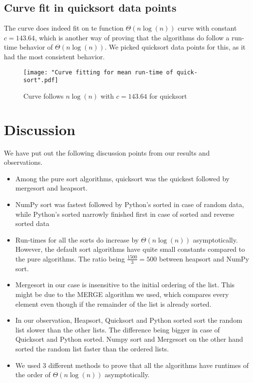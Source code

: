 \documentclass[sigconf, nonacm, natbib, screen, balance=False]{acmart}
\begin{document}
\subsection{Curve fit in quicksort data points}\label{sec:curveresult}
The curve does indeed fit on te function $\Theta \left(n\log\left(n\right)\right)$ curve with constant $c=143.64$, which is another way of proving that the algorithms do follow a run-time behavior of $\Theta \left(n\log\left(n\right)\right)$. We picked quicksort data points for this, as it had the most consistent behavior.

\begin{figure}[ht]
\texttt{[image: "Curve fitting for mean run-time of quick-sort".pdf]}
    \caption{Curve follows $n \log\left(n\right)$ with $c= 143.64$ for quicksort}
    \label{fig:curvefit}
\end{figure}

\section{Discussion}\label{sec:discussion}
We have put out the following discussion points from our results and observations.

\begin{itemize}
\item Among the pure sort algorithms, quicksort was the quickest followed by mergesort and heapsort.
\item NumPy sort was fastest followed by Python's sorted in case of random data, while Python's sorted narrowly finished first in case of sorted and reverse sorted data
\item Run-times for all the sorts do increase by $\Theta \left(n\log\left(n\right)\right)$ asymptotically. However, the default sort algorithms have quite small constants compared to the pure algorithms. The ratio being $\frac{1500}{3} = 500$ between heapsort and NumPy sort.
\item Mergesort in our case is insensitive to the initial ordering of the list. This might be due to the MERGE algorithm we used, which compares every element even though if the remainder of the list is already sorted.
\item In our observation, Heapsort, Quicksort and Python sorted sort the random list slower than the other lists. The difference being bigger in case of Quicksort and Python sorted. Numpy sort and Mergesort on the other hand sorted the random list faster than the ordered lists. 
\item We used 3 different methods to prove that all the algorithms have runtimes of the order of $\Theta \left(n\log\left(n\right)\right)$ asymptotically.
\end{itemize}
\end{document}
